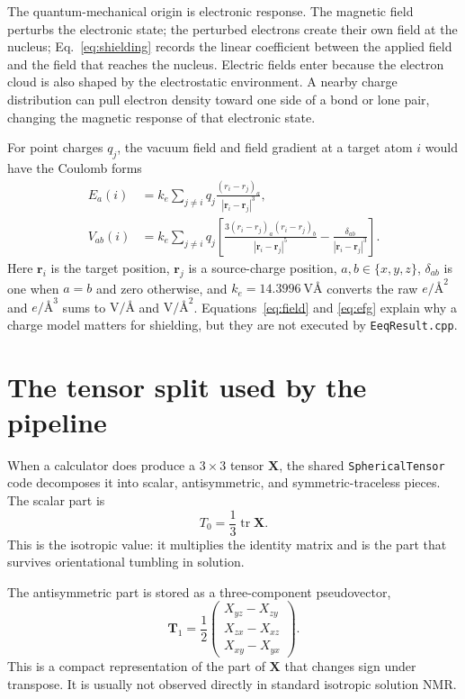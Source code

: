 \documentclass[11pt]{article}
\begin{document}
The quantum-mechanical origin is electronic response. The magnetic field
perturbs the electronic state; the perturbed electrons create their own field at
the nucleus; Eq.~\eqref{eq:shielding} records the linear coefficient between
the applied field and the field that reaches the nucleus. Electric fields enter
because the electron cloud is also shaped by the electrostatic environment. A
nearby charge distribution can pull electron density toward one side of a bond
or lone pair, changing the magnetic response of that electronic state.

For point charges \(q_j\), the vacuum field and field gradient at a target atom
\(i\) would have the Coulomb forms
\begin{align}
  E_a(i) &=
    k_e \sum_{j\ne i} q_j
    \frac{(r_i-r_j)_a}{|\bm r_i-\bm r_j|^3},
    \label{eq:field}\\
  V_{ab}(i) &=
    k_e \sum_{j\ne i} q_j
    \left[
      \frac{3(r_i-r_j)_a(r_i-r_j)_b}{|\bm r_i-\bm r_j|^5}
      - \frac{\delta_{ab}}{|\bm r_i-\bm r_j|^3}
    \right].
    \label{eq:efg}
\end{align}
Here \(\bm r_i\) is the target position, \(\bm r_j\) is a source-charge
position, \(a,b\in\{x,y,z\}\), \(\delta_{ab}\) is one when \(a=b\) and zero
otherwise, and \(k_e=\SI{14.3996}{\volt\angstrom}\) converts the raw
\(\si{\elementarycharge\per\angstrom\squared}\) and
\(\si{\elementarycharge\per\angstrom\cubed}\) sums to
\(\si{\volt\per\angstrom}\) and
\(\si{\volt\per\angstrom\squared}\). Equations~\eqref{eq:field} and
\eqref{eq:efg} explain why a charge model matters for shielding, but they are
not executed by \texttt{EeqResult.cpp}.

\section{The tensor split used by the pipeline}

When a calculator does produce a \(3\times3\) tensor \(\bm X\), the shared
\texttt{SphericalTensor} code decomposes it into scalar, antisymmetric, and
symmetric-traceless pieces. The scalar part is
\begin{equation}
  T_0 = \frac{1}{3}\operatorname{tr}\bm X .
  \label{eq:t0}
\end{equation}
This is the isotropic value: it multiplies the identity matrix and is the part
that survives orientational tumbling in solution.

The antisymmetric part is stored as a three-component pseudovector,
\begin{equation}
  \bm T_1 =
  \frac{1}{2}
  \begin{pmatrix}
    X_{yz}-X_{zy}\\
    X_{zx}-X_{xz}\\
    X_{xy}-X_{yx}
  \end{pmatrix}.
  \label{eq:t1}
\end{equation}
This is a compact representation of the part of \(\bm X\) that changes sign
under transpose. It is usually not observed directly in standard isotropic
solution NMR.
\end{document}
